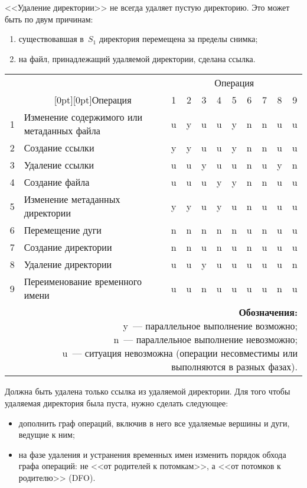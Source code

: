 \begin{multicols}{2}
      <<Удаление директории>> не всегда удаляет пустую директорию. Это 
может быть по двум причинам:
      \begin{enumerate}[(1)]
\item существовавшая в~$S_1$ директория перемещена за пределы снимка;
\item на файл, принадлежащий удаляемой директории, сделана ссылка.   
\end{enumerate}

\begin{table*}\small
\begin{center}
\vspace*{2ex}

\begin{tabular}{|rl|c|c|c|c|c|c|c|c|c|}
\hline
&&\multicolumn{9}{c|}{Операция}\\
\cline{3-11}
&\multicolumn{1}{c|}{\raisebox{6pt}[0pt][0pt]{Операция}}&1&2&3&4&5&6&7&8&9\\
\hline
1&Изменение содержимого или метаданных файла&u&y&u&u&y&n&n&u&u\\
2&Создание ссылки&y&y&u&u&y&n&n&u&u\\
3&Удаление ссылки&u&u&y&u&u&n&u&y&n\\
4&Создание файла    &u&u&u&y&y&n&n&u&u\\
5&Изменение метаданных директории&y&y&u&y&u&n&u&u&u\\
6&Перемещение дуги&n&n&n&n&n&u&n&u&u\\
7&Создание директории&n&n&u&n&u&n&u&u&u\\
8&Удаление директории&u&u&y&u&u&u&u&u&n\\
9&Переименование временного имени&u&u&n&u&u&u&u&n&u\\
\hline
\multicolumn{11}{p{128mm}}{\footnotesize{\textbf{Обозначения:}\newline
y~--- параллельное выполнение возможно;\newline
n~--- параллельное выполнение невозможно; \newline
u~--- ситуация невозможна (операции несовместимы или выполняются в разных фазах).}}
\end{tabular}
\end{center}
\vspace*{-6pt}
\end{table*} 

      Должна быть удалена только ссылка из удаля\-емой директории. Для того 
чтобы удаляемая директория была пуста, нужно сделать следующее:
      \begin{itemize}
\item дополнить граф операций, включив в него все удаляемые вершины и 
дуги, ведущие к ним;
\item на фазе удаления и устранения временных имен изменить порядок 
обхода графа операций: не <<от родителей к потомкам>>, а <<от потомков к 
родителю>> (DFO). 
\end{itemize}


\end{multicols}
